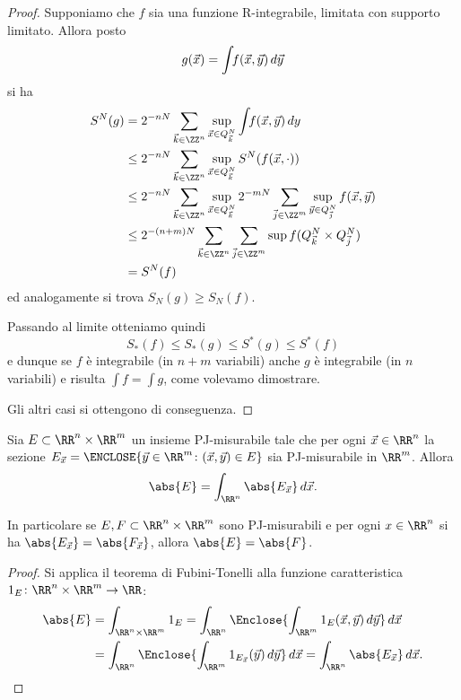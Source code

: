 \begin{proof}
Supponiamo che $f$ sia una funzione R-integrabile, 
limitata con supporto limitato.
Allora posto 
\[
    g(\vec x) = \int\!\! f(\vec x, \vec y)\, d\vec y\\
\]
si ha
\begin{align*}
    S^N(g)
    &= 2^{-nN} \sum_{\vec k\in \ZZ^n} 
        \sup_{\vec x\in Q^N_{\vec k}}
            \int\!\! f(\vec x,\vec y)\, dy\\
    &\le 2^{-nN} \sum_{\vec k\in \ZZ^n} 
        \sup_{\vec x\in Q^N_{\vec k}}
                S^N(f(\vec x,\cdot))\\
    &\le 2^{-nN} \sum_{\vec k\in \ZZ^n} 
        \sup_{\vec x\in Q^N_{\vec k}}
            2^{-mN} \sum_{\vec j \in \ZZ^m} 
                \sup_{\vec y \in Q^N_{\vec j}} 
                    f(\vec x, \vec y) \\
    &\le 2^{-(n+m)N} \sum_{\vec k\in \ZZ^n} 
        \sum_{\vec j \in \ZZ^m} 
        \sup f(Q^N_{\vec k}\times Q^N_{\vec j})\\
    &= S^N(f)
\end{align*}
ed analogamente si trova $S_N(g) \ge S_N(f)$.

Passando al limite otteniamo quindi 
\[
   S_*(f) \le S_*(g) \le S^*(g) \le S^*(f)
\]
e dunque se $f$ è integrabile (in $n+m$ variabili) anche $g$ è integrabile
(in $n$ variabili) 
e risulta $\int f = \int g$, come volevamo dimostrare.

Gli altri casi si ottengono di conseguenza.
\end{proof}

\begin{theorem}
  \label{th:cavalieri}
Sia $E \subset \RR^n\times \RR^m$ un insieme PJ-misurabile 
tale che per ogni $\vec x \in \RR^n$ la sezione 
$  E_{\vec x} = \ENCLOSE{\vec y \in \RR^m \colon (\vec x, \vec y) \in E} $ 
sia PJ-misurabile in $\RR^m$.
Allora
\[
  \abs{E} = \int_{\RR^n} \abs{E_{\vec x}}\, d\vec x.
\]

In particolare se $E,F\subset \RR^n\times \RR^m$ sono PJ-misurabili 
e per ogni $x\in \RR^n$ si ha $\abs{E_{\vec x}} = \abs{F_{\vec x}}$,
allora $\abs{E} = \abs{F}$.
\end{theorem}
\begin{proof}
Si applica il teorema di Fubini-Tonelli alla funzione caratteristica 
$1_E\colon \RR^n\times \RR^m \to \RR$:
\begin{align*}
  \abs{E} &= \int_{\RR^n\times \RR^m} 1_E
  = \int_{\RR^n} \Enclose{\int_{\RR^m} 1_E(\vec x, \vec y)\, d\vec y}\, d\vec x\\
  &= \int_{\RR^n} \Enclose{\int_{\RR^m} 1_{E_{\vec x}}(\vec y)\, d\vec y}\, d\vec x
  = \int_{\RR^n} \abs{E_{\vec x}}\, d \vec x.
\end{align*}
\end{proof}

